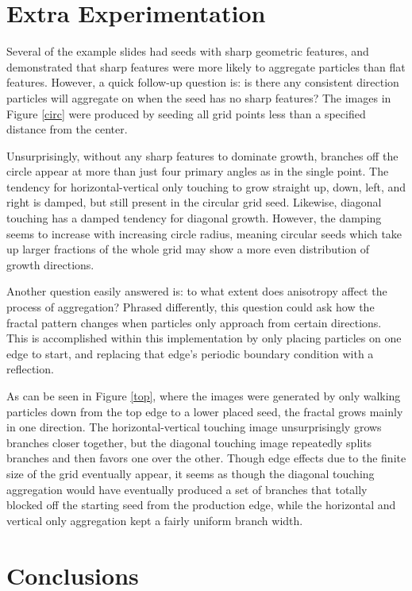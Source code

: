\documentclass[12pt]{article}
\begin{document}
\section*{Extra Experimentation}


Several of the example slides had seeds with sharp geometric features, and demonstrated that sharp features were more likely to aggregate particles than flat features.
However, a quick follow-up question is: is there any consistent direction particles will aggregate on when the seed has no sharp features?
The images in Figure \ref{circ} were produced by seeding all grid points less than a specified distance from the center.

Unsurprisingly, without any sharp features to dominate growth, branches off the circle appear at more than just four primary angles as in the single point.
The tendency for horizontal-vertical only touching to grow straight up, down, left, and right is damped, but still present in the circular grid seed.
Likewise, diagonal touching has a damped tendency for diagonal growth.
However, the damping seems to increase with increasing circle radius, meaning circular seeds which take up larger fractions of the whole grid may show a more even distribution of growth directions.

Another question easily answered is: to what extent does anisotropy affect the process of aggregation?  
Phrased differently, this question could ask how the fractal pattern changes when particles only approach from certain directions.
This is accomplished within this implementation by only placing particles on one edge to start, and replacing that edge's periodic boundary condition with a reflection.

As can be seen in Figure \ref{top}, where the images were generated by only walking particles down from the top edge to a lower placed seed, the fractal grows mainly in one direction.
The horizontal-vertical touching image unsurprisingly grows branches closer together, but the diagonal touching image repeatedly splits branches and then favors one over the other.
Though edge effects due to the finite size of the grid eventually appear, it seems as though the diagonal touching aggregation would have eventually produced a set of branches that totally blocked off the starting seed from the production edge, while the horizontal and vertical only aggregation kept a fairly uniform branch width.


\section*{Conclusions}
\end{document}
